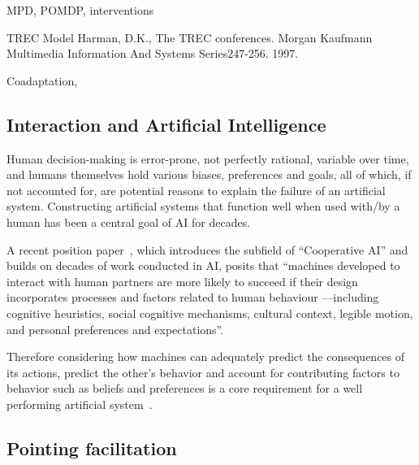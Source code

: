 \documentclass[12pt,a4paper]{article}
\begin{document}
MPD, POMDP, interventions

TREC Model Harman, D.K., The TREC conferences. Morgan 
Kaufmann Multimedia Information And Systems 
Series247-256. 1997. 


Coadaptation, 


\subsection{Interaction and Artificial Intelligence \label{sub:iui}}
Human decision-making is error-prone, not perfectly rational, variable over time, and humans themselves hold various biases, preferences and goals, all of which, if not accounted for, are potential reasons to explain the failure of an artificial system. Constructing artificial systems that function well when used with/by a human has been a central goal of AI for decades. 


A recent position paper~\cite{dafoe2020}, which introduces the subfield of ``Cooperative AI'' and builds on decades of work conducted in AI, posits that ``machines developed to interact with human partners are more likely to succeed if their design incorporates processes and factors related to human behaviour ---including cognitive heuristics, social cognitive mechanisms, cultural context, legible motion, and personal preferences and expectations''.


Therefore considering how machines can adequately predict the consequences of its actions, predict the other's behavior and account for contributing factors to behavior such as beliefs and preferences is a core requirement for a well performing artificial system~\cite{dafoe2020}.



\subsection{Pointing facilitation}
\end{document}
